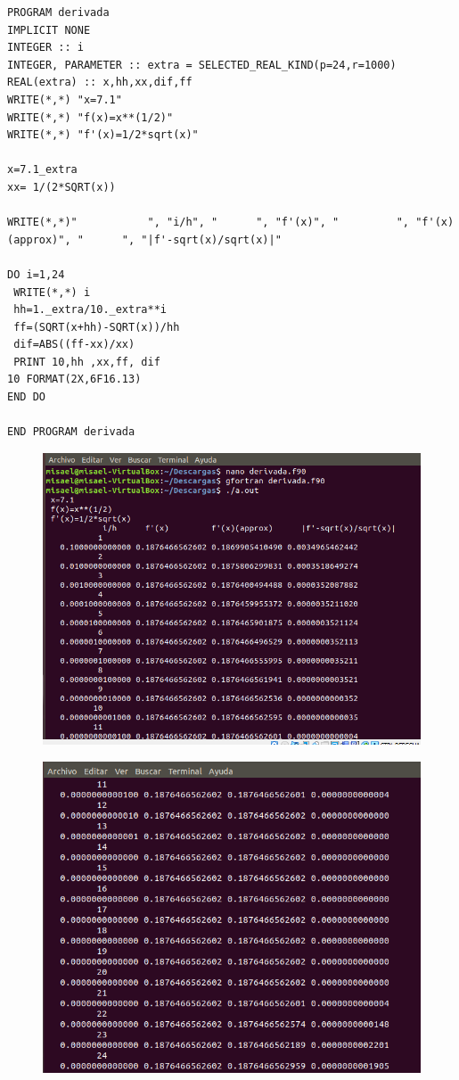 \documentclass[12pt,a4paper]{article}
\begin{document}
\begin{enumerate}
    \begin{verbatim}
PROGRAM derivada
IMPLICIT NONE
INTEGER :: i
INTEGER, PARAMETER :: extra = SELECTED_REAL_KIND(p=24,r=1000)
REAL(extra) :: x,hh,xx,dif,ff
WRITE(*,*) "x=7.1"
WRITE(*,*) "f(x)=x**(1/2)"
WRITE(*,*) "f'(x)=1/2*sqrt(x)"

x=7.1_extra
xx= 1/(2*SQRT(x))

WRITE(*,*)"           ", "i/h", "      ", "f'(x)", "         ", "f'(x)(approx)", "      ", "|f'-sqrt(x)/sqrt(x)|"

DO i=1,24
 WRITE(*,*) i
 hh=1._extra/10._extra**i
 ff=(SQRT(x+hh)-SQRT(x))/hh 
 dif=ABS((ff-xx)/xx)
 PRINT 10,hh ,xx,ff, dif
10 FORMAT(2X,6F16.13)
END DO

END PROGRAM derivada
    \end{verbatim}
    
    \begin{figure}[h]
        \centering
        \includegraphics[scale=0.8]{2.1.PNG}
    \end{figure}
    
    \begin{figure}[h]
        \centering
        \includegraphics[scale=0.8]{2.2.PNG}
    \end{figure}
    

\end{enumerate}
\end{document}
